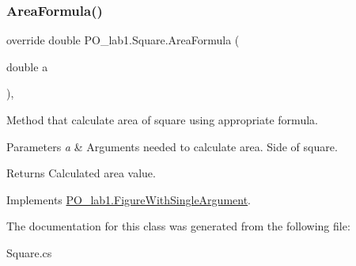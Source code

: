 \subsubsection{\texorpdfstring{Area\+Formula()}{AreaFormula()}}
{\footnotesize\ttfamily override double P\+O\+\_\+lab1.\+Square.\+Area\+Formula (\begin{DoxyParamCaption}\item[{double}]{a }\end{DoxyParamCaption})\hspace{0.3cm}{\ttfamily [inline]}, {\ttfamily [virtual]}}



Method that calculate area of square using appropriate formula. 


\begin{DoxyParams}{Parameters}
{\em a} & Arguments needed to calculate area. Side of square.\\
\hline
\end{DoxyParams}
\begin{DoxyReturn}{Returns}
Calculated area value.
\end{DoxyReturn}


Implements \mbox{\hyperlink{class_p_o__lab1_1_1_figure_with_single_argument}{P\+O\+\_\+lab1.\+Figure\+With\+Single\+Argument}}.



The documentation for this class was generated from the following file\+:\begin{DoxyCompactItemize}
\item 
Square.\+cs\end{DoxyCompactItemize}
